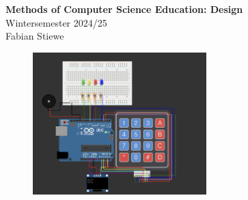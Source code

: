 \documentclass[10pt]{article}
\begin{document}
\begin{center}
  \Large \textbf{Methods of Computer Science Education: Design} \\
  \normalsize Wintersemester 2024/25 \\
  \normalsize Fabian Stiewe
\end{center}

\begin{figure}[h]
  \begin{center}
    \includegraphics[width=0.6\textwidth]{CircuitDiagram.png}
  \end{center}
\end{figure}
\end{document}
